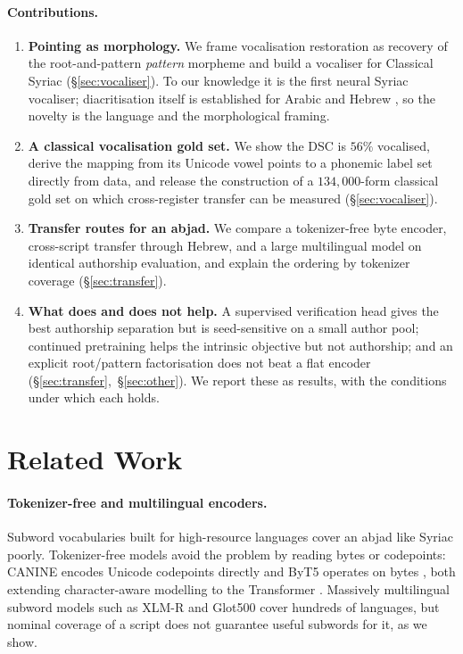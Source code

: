 \documentclass[11pt]{article}
\begin{document}
\paragraph{Contributions.}
\begin{enumerate}
  \item \textbf{Pointing as morphology.} We frame vocalisation restoration as
  recovery of the root-and-pattern \emph{pattern} morpheme and build a vocaliser
  for Classical Syriac (\S\ref{sec:vocaliser}). To our knowledge it is the first
  neural Syriac vocaliser; diacritisation itself is established for Arabic and
  Hebrew \citep{zalmout2019arabic,gershuni2022hebrew}, so the novelty is the
  language and the morphological framing.
  \item \textbf{A classical vocalisation gold set.} We show the DSC is $56\%$
  vocalised, derive the mapping from its Unicode vowel points to a phonemic label
  set directly from data, and release the construction of a $134{,}000$-form
  classical gold set on which cross-register transfer can be measured
  (\S\ref{sec:vocaliser}).
  \item \textbf{Transfer routes for an abjad.} We compare a tokenizer-free byte
  encoder, cross-script transfer through Hebrew, and a large multilingual model on
  identical authorship evaluation, and explain the ordering by tokenizer coverage
  (\S\ref{sec:transfer}).
  \item \textbf{What does and does not help.} A supervised verification head gives
  the best authorship separation but is seed-sensitive on a small author pool;
  continued pretraining helps the intrinsic objective but not authorship; and an
  explicit root/pattern factorisation does not beat a flat encoder
  (\S\ref{sec:transfer},~\S\ref{sec:other}). We report these as results, with the
  conditions under which each holds.
\end{enumerate}

\section{Related Work}
\label{sec:related}

\paragraph{Tokenizer-free and multilingual encoders.}
Subword vocabularies built for high-resource languages cover an abjad like Syriac
poorly. Tokenizer-free models avoid the problem by reading bytes or codepoints:
CANINE encodes Unicode codepoints directly \citep{clark2022canine} and ByT5
operates on bytes \citep{xue2022byt5}, both extending character-aware modelling
\citep{kim2016character} to the Transformer \citep{vaswani2017attention}.
Massively multilingual subword models such as XLM-R \citep{conneau2020xlmr} and
Glot500 \citep{imani2023glot500} cover hundreds of languages, but nominal coverage
of a script does not guarantee useful subwords for it, as we show.
\end{document}
